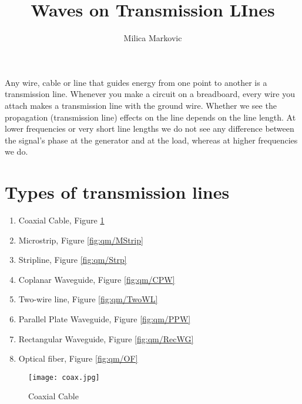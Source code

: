 \documentclass{ximera}
\title{Waves on Transmission LInes}
\author{Milica Markovic}
\begin{document}
  
\begin{abstract}  

\end{abstract}  
\maketitle    






Any wire, cable or line that guides energy from one point to another
is a transmission line. Whenever you make a circuit on a breadboard,
every wire you attach makes  a transmission line with the ground wire. Whether we see the propagation (transmission line) effects on the
line depends on the line length. 
At lower frequencies or very short line lengths we do not
see any difference between the signal's phase at the generator and at the load,
whereas at higher frequencies we do.








\section{Types of transmission lines}

\begin{enumerate}
\item Coaxial Cable, Figure \ref{fig:qm/Coax}
\item Microstrip, Figure \ref{fig:qm/MStrip}
\item Stripline, Figure \ref{fig:qm/Strp}
\item Coplanar Waveguide, Figure \ref{fig:qm/CPW}
\item Two-wire line, Figure \ref{fig:qm/TwoWL}
\item Parallel Plate Waveguide, Figure \ref{fig:qm/PPW}
\item Rectangular Waveguide, Figure \ref{fig:qm/RecWG}
\item Optical fiber, Figure \ref{fig:qm/OF}
\end{enumerate}




\begin{figure}[ht!]
\begin{center}
\texttt{[image: coax.jpg]}
\caption{\label{fig:qm/Coax} Coaxial Cable}
\end{center}
\end{figure}
\end{document}
